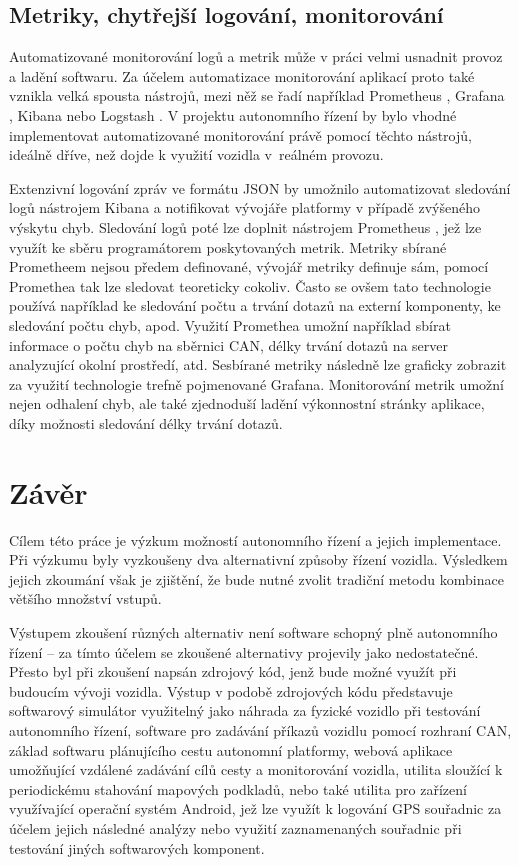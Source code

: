 \documentclass[czech, bachelor]{diploma}
\begin{document}
\section{Metriky, chytřejší logování, monitorování}

Automatizované monitorování logů \cite{elk-source} a metrik \cite{prometheus-source} může v práci velmi usnadnit provoz a ladění
softwaru. Za účelem automatizace monitorování aplikací proto také vznikla velká spousta nástrojů, mezi něž se řadí například
Prometheus \cite{prometheus-source}, Grafana \cite{prometheus-source}, Kibana nebo Logstash \cite{elk-source}. V projektu
autonomního řízení by bylo vhodné implementovat automatizované monitorování právě pomocí těchto nástrojů,
ideálně dříve, než dojde k využití vozidla v~reálném provozu.

Extenzivní logování zpráv ve formátu JSON by umožnilo automatizovat sledování logů nástrojem Kibana \cite{elk-source} a
notifikovat vývojáře platformy v případě zvýšeného výskytu chyb. Sledování logů poté lze doplnit nástrojem Prometheus 
\cite{prometheus-source}, jež lze využít ke sběru programátorem poskytovaných metrik. Metriky sbírané Prometheem nejsou předem
definované, vývojář metriky definuje sám, pomocí Promethea tak lze sledovat teoreticky cokoliv. Často se ovšem tato technologie
používá například ke sledování počtu a trvání dotazů na externí komponenty, ke sledování počtu chyb, apod. Využití Promethea
umožní například sbírat informace o počtu chyb na sběrnici CAN, délky trvání dotazů na server analyzující okolní prostředí, atd.
Sesbírané metriky následně lze graficky zobrazit za využití technologie trefně pojmenované Grafana. Monitorování metrik umožní
nejen odhalení chyb, ale také zjednoduší ladění výkonnostní stránky aplikace, díky možnosti sledování délky trvání dotazů.

\chapter{Závěr}

Cílem této práce je výzkum možností autonomního řízení a jejich implementace. Při výzkumu byly vyzkoušeny dva alternativní způsoby
řízení vozidla. Výsledkem jejich zkoumání však je zjištění, že bude nutné zvolit tradiční metodu kombinace většího množství
vstupů.

Výstupem zkoušení různých alternativ není software schopný plně autonomního řízení -- za tímto účelem se zkoušené alternativy
projevily jako nedostatečné. Přesto byl při zkoušení napsán zdrojový kód, jenž bude možné využít při budoucím vývoji vozidla. 
Výstup v podobě zdrojových kódu představuje softwarový simulátor využitelný jako náhrada za fyzické vozidlo při testování 
autonomního řízení, software pro zadávání příkazů vozidlu pomocí rozhraní CAN, základ softwaru plánujícího cestu autonomní 
platformy, webová aplikace umožňující vzdálené zadávání cílů cesty a monitorování vozidla, utilita sloužící k periodickému
stahování mapových podkladů, nebo také utilita pro zařízení využívající operační systém Android, jež lze využít k logování GPS 
souřadnic za účelem jejich následné analýzy nebo využití zaznamenaných souřadnic při testování jiných softwarových komponent.
\end{document}
